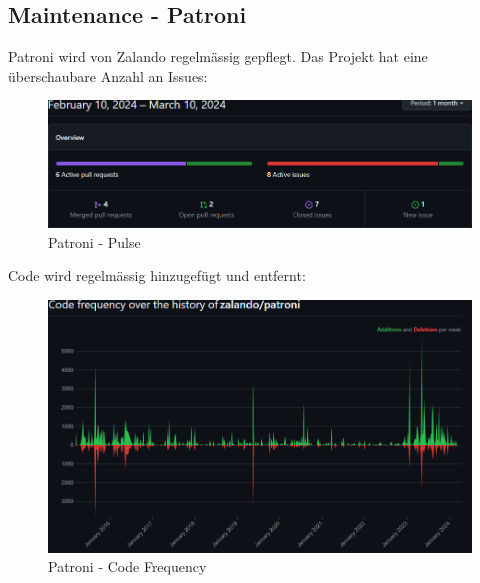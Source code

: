 
\clearpage
\begin{flushleft}
    \subsection{Maintenance - Patroni}
    \label{subsec:maintenance_patroni}
    Patroni wird von Zalando regelmässig gepflegt.
    Das Projekt hat eine überschaubare Anzahl an Issues:
    \begin{figure}[H]
        \centering
        \includegraphics[width=0.75\linewidth]{source/implementation/evaluation/postgresql_ha_solutions/insights/patroni/pulse_zalando_patroni}
        \caption{Patroni - Pulse}
        \label{fig:pulse_zalando_patroni}
    \end{figure}
    Code wird regelmässig hinzugefügt und entfernt:
    \begin{figure}[H]
        \centering
        \includegraphics[width=0.75\linewidth]{source/implementation/evaluation/postgresql_ha_solutions/insights/patroni/code_frequency_zalando_patroni}
        \caption{Patroni - Code Frequency}
        \label{fig:code_frequency_zalando_patroni}
    \end{figure}
\end{flushleft}
\clearpage
